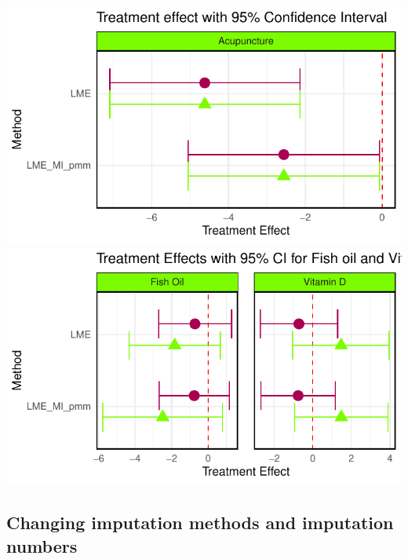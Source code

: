 \documentclass{article}
\newcommand{\pandocbounded}[1]{#1}
\begin{document}
\pandocbounded{\includegraphics[keepaspectratio]{Final_Report_files/figure-latex/unnamed-chunk-31-1.pdf}}
\pandocbounded{\includegraphics[keepaspectratio]{Final_Report_files/figure-latex/unnamed-chunk-31-2.pdf}}

\subsection{Changing imputation methods and imputation
numbers}\label{changing-imputation-methods-and-imputation-numbers}
\end{document}
